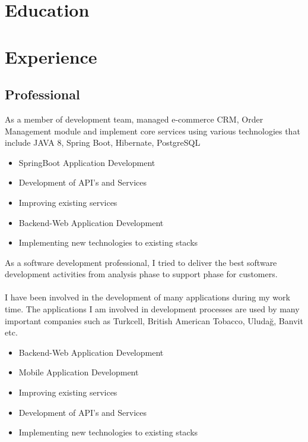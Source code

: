 \documentclass[11pt,a4paper,sans]{moderncv}
\begin{document}
\makecvtitle
\section{Education}

\section{Experience}
\subsection{Professional}
{
	\textnormal
	{
		As a member of development team, managed e-commerce CRM, Order Management module and implement core services using various technologies that include JAVA 8, Spring Boot, Hibernate, PostgreSQL
	}
	\\
	\begin{itemize}%
		\item SpringBoot Application Development
		\item Development of API's and Services
		\item Improving existing services \\
	\end{itemize}
}
{
	\begin{itemize}%
		\item Backend-Web Application Development
		\item Implementing new technologies to existing stacks \\
	\end{itemize}
}
{
	\textnormal
	{
		As a software development professional, I tried to deliver the best software development activities from analysis phase to support phase for customers.\\ \\
		I have been involved in the development of many applications during my work time. The applications I am involved in development processes are used by many important companies such as Turkcell, British American Tobacco, Uludağ, Banvit etc.
	}
	\\
	\begin{itemize}%
		\item Backend-Web Application Development
		\item Mobile Application Development
		\item Improving existing services
		\item Development of API's and Services
		\item Implementing new technologies to existing stacks
	\end{itemize}
}
\pagebreak
\end{document}
